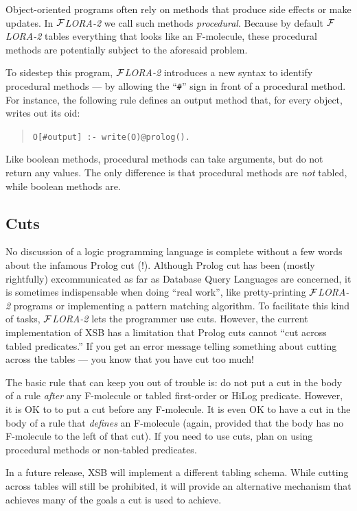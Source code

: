 \documentclass[11pt]{article}
\newcommand{\FLORA}{{\mbox{${\cal F}${\small\it LORA}\rm\emph{-2}}}\xspace}
\begin{document}
Object-oriented programs often rely on methods that produce side effects
or make updates.  In \FLORA we call such methods \emph{procedural}.
Because by default \FLORA tables everything that looks like an F-molecule,
these procedural methods are potentially subject to the aforesaid problem.

To sidestep this program, \FLORA introduces a new syntax to identify
procedural methods --- by allowing the ``\verb|#|'' sign in front of a
procedural method. For instance, the following rule defines an output
method that, for every object, writes out its oid:
\begin{quote}
\verb|O[#output] :- write(O)@prolog().|
\end{quote}
Like boolean methods, procedural methods can take arguments, but do not
return any values.  The only difference is that procedural methods are
\emph{not} tabled, while boolean methods are.


\subsection{Cuts}


\index{cuts in \FLORA}
No discussion of a logic programming language is complete without a few
words about the infamous Prolog cut (!). Although Prolog cut has been
(mostly rightfully) excommunicated as far as Database Query Languages are
concerned, it is sometimes indispensable when doing ``real work'', like
pretty-printing \FLORA programs or implementing a pattern matching
algorithm.  To facilitate this kind of tasks, \FLORA lets the programmer
use cuts.  However, the current implementation of XSB has a limitation that
Prolog cuts cannot ``cut across tabled predicates.''  If you get an error
message telling something about cutting across the tables --- you know that
you have cut too much!

The basic rule that can keep you out of trouble is: do not put a cut in the
body of a rule \emph{after} any F-molecule or tabled first-order or HiLog
predicate. However, it is OK to to put a cut before any F-molecule. It is
even OK to have a cut in the body of a rule that \emph{defines} an
F-molecule (again, provided that the body has no F-molecule to the left of
that cut). If you need to use cuts, plan on using procedural methods or
non-tabled predicates.

In a future release, XSB will implement a different tabling schema. While
cutting across tables will still be prohibited, it will provide an
alternative mechanism that achieves many of the goals a cut is used to
achieve.
\end{document}
